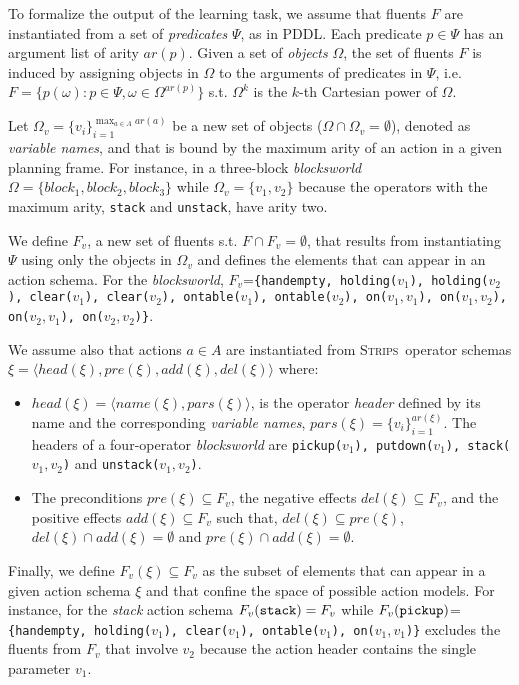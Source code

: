 \documentclass{article}
\newcommand{\tup}[1]{{\langle #1 \rangle}}
\newcommand{\strips}{\textsc{Strips}}     %
\begin{document}
To formalize the output of the learning task, we assume that fluents $F$ are instantiated from a set of {\em predicates} $\Psi$, as in PDDL. Each predicate $p\in\Psi$ has an argument list of arity $ar(p)$. Given a set of {\em objects} $\Omega$, the set of fluents $F$ is induced by assigning objects in $\Omega$ to the arguments of predicates in $\Psi$, i.e.~$F=\{p(\omega):p\in\Psi,\omega\in\Omega^{ar(p)}\}$ s.t. $\Omega^k$ is the $k$-th Cartesian power of $\Omega$.

Let $\Omega_v=\{v_i\}_{i=1}^{\operatorname*{max}_{a\in A} ar(a)}$ be a new set of objects ($\Omega\cap\Omega_v=\emptyset$), denoted as {\em variable names}, and that is bound by the maximum arity of an action in a given planning frame. For instance, in a three-block {\em blocksworld} $\Omega=\{block_1, block_2, block_3\}$ while $\Omega_v=\{v_1, v_2\}$ because the operators with the maximum arity, {\small\tt stack} and {\small\tt unstack}, have arity two.

We define $F_v$, a new set of fluents s.t. $F\cap F_v=\emptyset$, that results from instantiating $\Psi$ using only the objects in $\Omega_v$ and defines the elements that can appear in an action schema. For the {\em blocksworld}, $F_v$={\small\tt\{handempty, holding($v_1$), holding($v_2$), clear($v_1$), clear($v_2$), ontable($v_1$), ontable($v_2$), on($v_1,v_1$), on($v_1,v_2$), on($v_2,v_1$), on($v_2,v_2$)\}}.

We assume also that actions $a\in A$ are instantiated from \strips\ operator schemas $\xi=\tup{head(\xi),pre(\xi),add(\xi),del(\xi)}$ where:
\begin{itemize}
\item $head(\xi)=\tup{name(\xi),pars(\xi)}$, is the operator {\em header} defined by its name and the corresponding {\em variable names}, $pars(\xi)=\{v_i\}_{i=1}^{ar(\xi)}$. The headers of a four-operator {\em blocksworld} are {\small\tt pickup($v_1$), putdown($v_1$), stack($v_1,v_2$)} and {\small\tt unstack($v_1,v_2$)}.
\item The preconditions $pre(\xi)\subseteq F_v$, the negative effects $del(\xi)\subseteq F_v$, and the positive effects $add(\xi)\subseteq F_v$ such that, $del(\xi)\subseteq pre(\xi)$, $del(\xi)\cap add(\xi)=\emptyset$ and $pre(\xi)\cap add(\xi)=\emptyset$.
\end{itemize}

Finally, we define $F_v(\xi)\subseteq F_v$ as the subset of elements that can appear in a given action schema $\xi$ and that confine the space of possible action models. For instance, for the {\em stack} action schema $F_v({\tt stack})=F_v$ while $F_v({\tt pickup})$={\small\tt\{handempty, holding($v_1$), clear($v_1$), ontable($v_1$), on($v_1,v_1$)\}} excludes the fluents from $F_v$ that involve $v_2$ because the action header contains the single parameter $v_1$.
\end{document}
